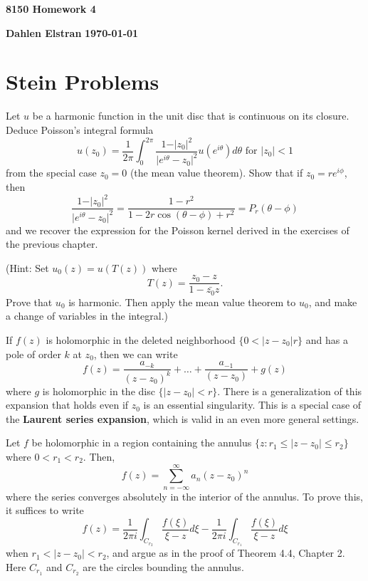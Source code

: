 \documentclass[12pt]{article}
\begin{document}
\begin{newtitle}
  \begin{center}
    \textbf{\Huge 8150 Homework 4}
  \end{center}
  \textbf{Dahlen Elstran} \hfill \textbf{\today}
\end{newtitle}

\section{Stein Problems}

\begin{statement}[3.9.2]
  Let $u$ be a harmonic function in the unit disc that is continuous on its closure. Deduce Poisson's integral formula 
  $$ u(z_0)=\frac{1}{2\pi}\int^{2\pi}_0 \frac{1 - \vert z_0 \vert ^2}{\vert e^{i \theta} - z_0 \vert ^2} u(e^{i \theta}) d \theta \text{ for } \vert z_0 \vert < 1 $$
  from the special case $z_0=0$ (the mean value theorem). Show that if $z_0=re^{i \phi}$, then 
  $$ \frac{1 - \vert z_0 \vert ^2}{\vert e^{i \theta} - z_0 \vert ^2} = \frac{1 - r^2}{1-2r \cos(\theta - \phi) + r^2} = P_r(\theta - \phi) $$
  and we recover the expression for the Poisson kernel derived in the exercises of the previous chapter.
  \par (Hint: Set $u_0(z)=u(T(z))$ where 
  $$ T(z) = \frac{z_0 - z}{1 - \bar{z_0}z}. $$ 
  Prove that $u_0$ is harmonic. Then apply the mean value theorem to $u_0$, and make a change of variables in the integral.)
\end{statement}
\begin{newproof}

\end{newproof}

\begin{statement}[3.9.3]
  If $f(z)$ is holomorphic in the deleted neighborhood $\{ 0 < \vert z - z_0 \vert r \}$ and has a pole of order $k$ at $z_0$, then
  we can write 
  $$ f(z)=\frac{a_{-k}}{(z-z_0)^k} + \dots + \frac{a_{-1}}{(z-z_0)} + g(z) $$
  where $g$ is holomorphic in the disc $\{ \vert z - z_0 \vert < r\}$. There is a generalization of this expansion that holds 
  even if $z_0$ is an essential singularity. This is a special case of the \textbf{Laurent series expansion}, which is valid in an 
  even more general settings. 
  \par Let $f$ be holomorphic in a region containing the annulus $\{ z : r_1 \leq \vert z - z_0 \vert \leq r_2 \}$ where 
  $0 < r_1 < r_2$. Then,
  $$ f(z) = \sum^{\infty}_{n=-\infty} a_n(z - z_0)^n $$ 
  where the series converges absolutely in the interior of the annulus. To prove this, it suffices to write 
  $$ f(z) = \frac{1}{2\pi i} \int_{C_{r_2}} \frac{f(\xi)}{\xi - z}d \xi - \frac{1}{2 \pi i} \int_{C_{r_1}} \frac{f(\xi)}{\xi - z} d \xi $$
  when $r_1 < \vert z - z_0 \vert < r_2$, and argue as in the proof of Theorem 4.4, Chapter 2. Here $C_{r_1}$ and 
  $C_{r_2}$ are the circles bounding the annulus.
\end{statement}
\begin{newproof}

\end{newproof}
\end{document}
